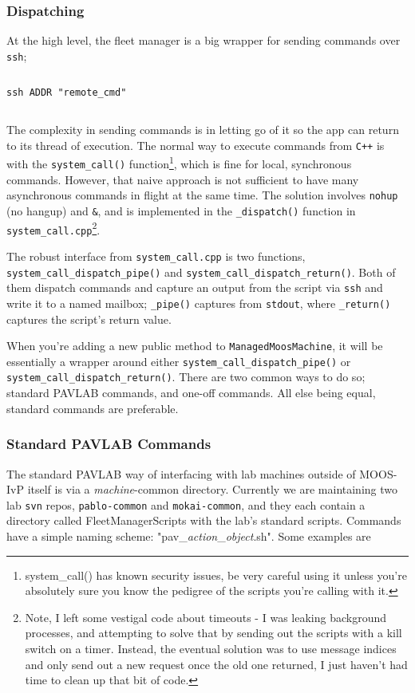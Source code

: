 \documentclass[11pt]{article}
\newcommand{\cmdline}[1]{\vspace{.2em} $\:$\\ \begin{minipage}{\dimexpr\textwidth-2cm}
\texttt{#1}
\end{minipage} $\:$\\ \vspace{-.2em} }
\begin{document}
\subsubsection{Dispatching}
At the high level, the fleet manager is a big wrapper for sending commands over \texttt{ssh};

\cmdline{ssh ADDR "remote\_cmd"}

The complexity in sending commands is in letting go of it so the app can return to its thread of execution. The normal way to execute commands from \texttt{C++} is with the \texttt{system\_call()} function\footnote{system\_call() has known security issues, be very careful using it unless you're absolutely sure you know the pedigree of the scripts you're calling with it.}, which is fine for local, synchronous commands. However, that naive approach is not sufficient to have many asynchronous commands in flight at the same time. The solution involves \texttt{nohup} (no hangup) and \texttt{\&}, and is implemented in the \texttt{\_dispatch()} function in \texttt{system\_call.cpp}\footnote{Note, I left some vestigal code about timeouts - I was leaking background processes, and attempting to solve that by sending out the scripts with a kill switch on a timer. Instead, the eventual solution was to use message indices and only send out a new request once the old one returned, I just haven't had time to clean up that bit of code.}.

The robust interface from \texttt{system\_call.cpp} is two functions, \texttt{system\_call\_dispatch\_pipe()} and \texttt{system\_call\_dispatch\_return()}. Both of them dispatch commands and capture an output from the script via \texttt{ssh} and write it to a named mailbox; \texttt{\_pipe()} captures from \texttt{stdout}, where \texttt{\_return()} captures the script's return value.

When you're adding a new public method to \texttt{ManagedMoosMachine}, it will be essentially a wrapper around either \texttt{system\_call\_dispatch\_pipe()} or \texttt{system\_call\_dispatch\_return()}. There are two common ways to do so; standard PAVLAB commands, and one-off commands. All else being equal, standard commands are preferable.

\subsubsection{Standard PAVLAB Commands}

The standard PAVLAB way of interfacing with lab machines outside of MOOS-IvP itself is via a \textit{machine}-common directory. Currently we are maintaining two lab \texttt{svn} repos, \texttt{pablo-common} and \texttt{mokai-common}, and they each contain a directory called FleetManagerScripts with the lab's standard scripts. Commands have a simple naming scheme: "pav\_\textit{action}\_\textit{object}.sh". Some examples are 
\end{document}
